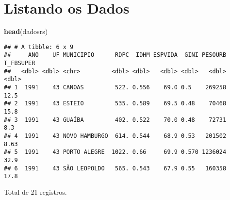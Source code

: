 \documentclass[]{article}
\newenvironment{Shaded}{\begin{snugshade}}{\end{snugshade}}
\newcommand{\KeywordTok}[1]{\textcolor[rgb]{0.13,0.29,0.53}{\textbf{#1}}}
\newcommand{\DecValTok}[1]{\textcolor[rgb]{0.00,0.00,0.81}{#1}}
\newcommand{\StringTok}[1]{\textcolor[rgb]{0.31,0.60,0.02}{#1}}
\newcommand{\OperatorTok}[1]{\textcolor[rgb]{0.81,0.36,0.00}{\textbf{#1}}}
\newcommand{\NormalTok}[1]{#1}
\begin{document}
\begin{Shaded}
\end{Shaded}

\section{Listando os Dados}\label{listando-os-dados}

\begin{Shaded}
\begin{Highlighting}[]
\KeywordTok{head}\NormalTok{(dadosrs)}
\end{Highlighting}
\end{Shaded}

\begin{verbatim}
## # A tibble: 6 x 9
##     ANO    UF MUNICIPIO      RDPC  IDHM ESPVIDA  GINI PESOURB T_FBSUPER
##   <dbl> <dbl> <chr>         <dbl> <dbl>   <dbl> <dbl>   <dbl>     <dbl>
## 1  1991    43 CANOAS         522. 0.556    69.0 0.5    269258     12.5 
## 2  1991    43 ESTEIO         535. 0.589    69.5 0.48    70468     15.8 
## 3  1991    43 GUAÍBA         402. 0.522    70.0 0.48    72731      8.3 
## 4  1991    43 NOVO HAMBURGO  614. 0.544    68.9 0.53   201502      8.63
## 5  1991    43 PORTO ALEGRE  1022. 0.66     69.9 0.570 1236024     32.9 
## 6  1991    43 SÃO LEOPOLDO   565. 0.543    67.9 0.55   160358     17.8
\end{verbatim}

Total de 21 registros.
\end{document}

